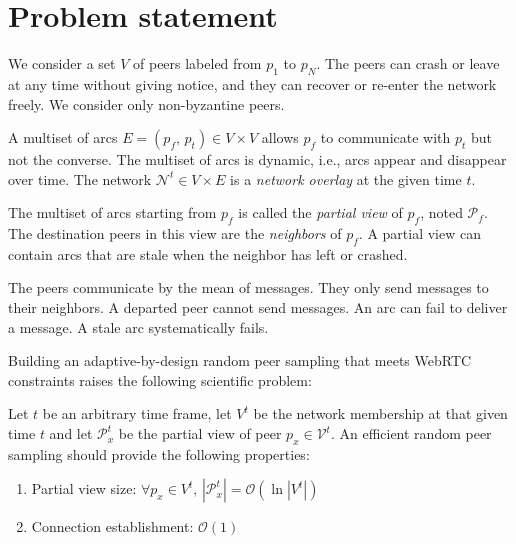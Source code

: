
\section{Problem statement}
\label{sec:problem}

We consider a set $V$ of peers labeled from $p_1$ to $p_N$.  The peers can
crash or leave at any time without giving notice, and they can recover or
re-enter the network freely. We consider only non-byzantine peers.

A multiset of arcs $E = (p_f,\,p_t) \in V \times V$ allows $p_f$ to communicate
with $p_t$ but not the converse. The multiset of arcs is dynamic, i.e., arcs
appear and disappear over time. The network $\mathcal{N}^t \in V \times E$ is a
\emph{network overlay} at the given time $t$.

The multiset of arcs starting from $p_f$ is called the \emph{partial view} of
$p_f$, noted $\mathcal{P}_f$. The destination peers in this view are the
\emph{neighbors} of $p_f$. A partial view can contain arcs that are stale when
the neighbor has left or crashed.

The peers communicate by the mean of messages. They only send messages to their
neighbors. A departed peer cannot send messages. An arc can fail to deliver a
message. A stale arc systematically fails.

Building an adaptive-by-design random peer sampling that meets WebRTC
constraints raises the following scientific problem:
\begin{problem}
  Let $t$ be an arbitrary time frame, let $V^t$ be the network membership at
  that given time $t$ and let $\mathcal{P}_x^t$ be the partial view of peer
  $p_x \in \mathcal{V}^t$.  An efficient random peer sampling should provide
  the following properties:
  \begin{enumerate}
  \item Partial view size: \hfill
    $\forall p_x \in V^t,\, |\mathcal{P}_x^t| = \mathcal{O} (\ln
    |V^t|)$      
  \item Connection establishment: \hfill $\mathcal{O}(1)$
  \end{enumerate}
\end{problem}

